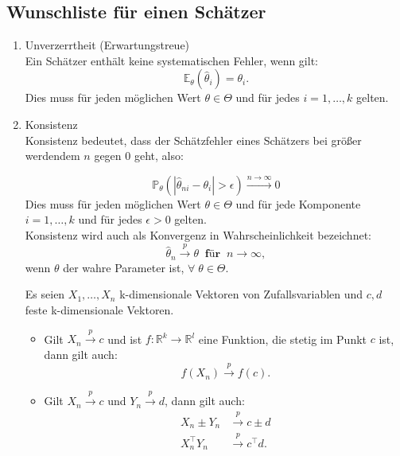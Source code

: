\documentclass[10pt]{article}
\newcommand{\FZV}{X_1, \ldots, X_n} %
\newcommand{\IR}{\mathbb{R}} %
\newcommand{\EW}{\mathbb{E}} %
\newcommand{\KW}{\overset{p} \longrightarrow} %
\begin{document}
	
\subsection{Wunschliste für einen Schätzer}
\begin{enumerate}
	\item Unverzerrtheit (Erwartungstreue)\\
	Ein Schätzer enthält keine systematischen Fehler, wenn gilt:
	\begin{equation*}
		\EW_\theta(\hat{\theta}_i) = \theta_i.
	\end{equation*}
	Dies muss für jeden möglichen Wert $\theta \in \Theta$ und für jedes $i = 1, \ldots, k$ gelten. 
	
	\item Konsistenz \\
	Konsistenz bedeutet, dass der Schätzfehler eines Schätzers bei größer werdendem $n$ gegen $0$ geht, also:
	
	
	\begin{equation*}
			\mathbb{P}_\theta(|\hat{\theta}_{ni} - \theta_i| > \epsilon) \overset{n \rightarrow \infty}{\longrightarrow} 0
	\end{equation*}
	Dies muss für jeden möglichen Wert $\theta \in \Theta$ und für jede Komponente $i = 1, \ldots, k$ und für jedes $\epsilon > 0$ gelten.\\
	Konsistenz wird  auch als Konvergenz in Wahrscheinlichkeit bezeichnet:
	\begin{equation*}
		\hat{\theta}_n \overset{p} \longrightarrow \theta \;\; \textbf{für} \;\; n \rightarrow \infty,
	\end{equation*}
	wenn $\theta$ der wahre Parameter ist, $\forall \; \theta \in \Theta$. \\
	
	\begin{Bemerkung} 
		Es seien $\FZV$ k-dimensionale Vektoren von Zufallsvariablen und $c,d$  feste k-dimensionale Vektoren. 
		\begin{itemize}
			\item Gilt $X_n \KW c$ und ist $f: \IR^k \rightarrow \IR^l$ eine Funktion, die stetig im Punkt $c$ ist, dann gilt auch: \begin{equation*}
				f(X_n) \KW f(c).
			\end{equation*}
			\item Gilt $X_n \KW c$ und $Y_n \KW d$, dann gilt auch:
			\begin{equation*}
				\begin{split}
					X_n \pm Y_n &\KW c \pm d\\
					X_n^\top Y_n &\KW c^\top d.
				\end{split}
			\end{equation*}
		\end{itemize}
	\end{Bemerkung}
	

\end{enumerate}
\end{document}
